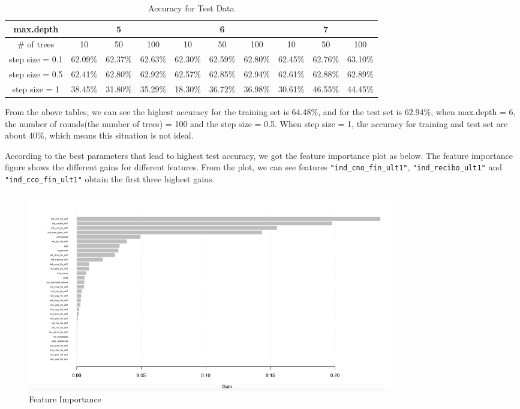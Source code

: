 \documentclass{article}
\begin{document}
\begin{spacing}{1}
\begin{large}
\begin{table}[h]
\centering
\caption{Accuracy for Test Data}
\label{Accuracy for Test Data}
\begin{tabular}{cccccccccc}
\hline
max.depth       & \multicolumn{3}{c}{5} & \multicolumn{3}{c}{6} & \multicolumn{3}{c}{7} \\ \hline
\# of trees     & 10    & 50    & 100   & 10  & 50       & 100  & 10    & 50    & 100   \\
step size = 0.1 & 62.09\%      & 62.37\%     & 62.63\%      &62.30\%     & 62.59\%       & 62.80\%      & 62.45\%      & 62.76\%      & 63.10\%      \\
step size = 0.5 & 62.41\%     & 62.80\%     & 62.92\%      & 62.57\%    &62.85\%     & 62.94\%   & 62.61\%      & 62.88\%      & 62.89\%      \\
step size = 1   &38.45\%       & 31.80\%      & 35.29\%      &18.30\%     & 36.72\%         &  36.98\% &30.61\%       &46.55\%      &44.45\%     \\ \hline
\end{tabular}
\end{table}

\noindent \indent From the above tables, we can see the highest accuracy for the training set is 64.48\%, and for the test set is 62.94\%, when max.depth = 6, the number of rounds(the number of trees) = 100 and the step size = 0.5.  When step size = 1, the accuracy for training and test set are about 40\%, which means this situation is not ideal.

\noindent \indent According to the best parameters that lead to highest test accuracy, we got the feature importance plot  as below. The feature importance figure shows the different gains for different features. From the plot, we can see features \verb|"ind_cno_fin_ult1"|, \verb|"ind_recibo_ult1"| and \verb|"ind_cco_fin_ult1"| obtain the first three highest gains.

\begin{figure}[H]
\centering
\includegraphics[width = 160mm]{113.png}
\caption{Feature Importance}
\end{figure}


\end{large}
\end{spacing}
\end{document}
